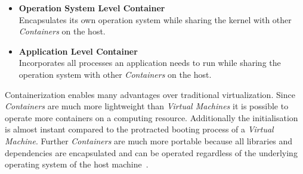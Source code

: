 \begin{itemize}
    \item[]{\textbf{Operation System Level Container}\\
    Encapsulates its own operation system while sharing the kernel with other \textit{Containers} on the host.}
    \item[]{\textbf{Application Level Container}\\
    Incorporates all processes an application needs to run while sharing the operation system with other \textit{Containers} on the host.}
\end{itemize}
Containerization enables many advantages over traditional virtualization.
Since \textit{Containers} are much more lightweight than \textit{Virtual Machines} it is possible to operate more containers on a computing resource.
Additionally the initialisation is almost instant compared to the protracted booting process of a \textit{Virtual Machine}.
Further \textit{Containers} are much more portable because all libraries and dependencies are encapsulated and can be operated regardless of the underlying operating system of the host machine~\cite{docker2, docker1, virt1}.

